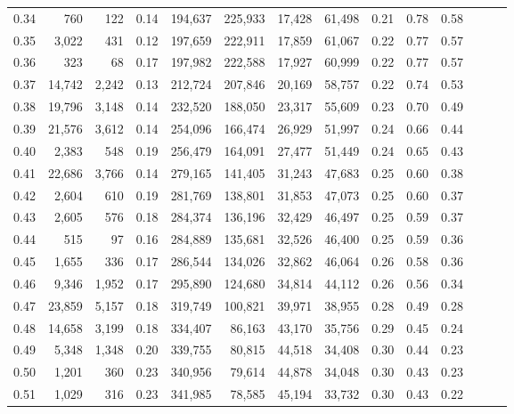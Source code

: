 \begin{tabular}{rrrrrrrrrrrrrr}
0.34 &     760 &    122 &  0.14 &  194,637 &  225,933 &  17,428 &  61,498 &  0.21 &  0.78 &      0.58 \\
0.35 &   3,022 &    431 &  0.12 &  197,659 &  222,911 &  17,859 &  61,067 &  0.22 &  0.77 &      0.57 \\
0.36 &     323 &     68 &  0.17 &  197,982 &  222,588 &  17,927 &  60,999 &  0.22 &  0.77 &      0.57 \\
0.37 &  14,742 &  2,242 &  0.13 &  212,724 &  207,846 &  20,169 &  58,757 &  0.22 &  0.74 &      0.53 \\
0.38 &  19,796 &  3,148 &  0.14 &  232,520 &  188,050 &  23,317 &  55,609 &  0.23 &  0.70 &      0.49 \\
0.39 &  21,576 &  3,612 &  0.14 &  254,096 &  166,474 &  26,929 &  51,997 &  0.24 &  0.66 &      0.44 \\
0.40 &   2,383 &    548 &  0.19 &  256,479 &  164,091 &  27,477 &  51,449 &  0.24 &  0.65 &      0.43 \\
0.41 &  22,686 &  3,766 &  0.14 &  279,165 &  141,405 &  31,243 &  47,683 &  0.25 &  0.60 &      0.38 \\
0.42 &   2,604 &    610 &  0.19 &  281,769 &  138,801 &  31,853 &  47,073 &  0.25 &  0.60 &      0.37 \\
0.43 &   2,605 &    576 &  0.18 &  284,374 &  136,196 &  32,429 &  46,497 &  0.25 &  0.59 &      0.37 \\
0.44 &     515 &     97 &  0.16 &  284,889 &  135,681 &  32,526 &  46,400 &  0.25 &  0.59 &      0.36 \\
0.45 &   1,655 &    336 &  0.17 &  286,544 &  134,026 &  32,862 &  46,064 &  0.26 &  0.58 &      0.36 \\
0.46 &   9,346 &  1,952 &  0.17 &  295,890 &  124,680 &  34,814 &  44,112 &  0.26 &  0.56 &      0.34 \\
0.47 &  23,859 &  5,157 &  0.18 &  319,749 &  100,821 &  39,971 &  38,955 &  0.28 &  0.49 &      0.28 \\
0.48 &  14,658 &  3,199 &  0.18 &  334,407 &   86,163 &  43,170 &  35,756 &  0.29 &  0.45 &      0.24 \\
0.49 &   5,348 &  1,348 &  0.20 &  339,755 &   80,815 &  44,518 &  34,408 &  0.30 &  0.44 &      0.23 \\
0.50 &   1,201 &    360 &  0.23 &  340,956 &   79,614 &  44,878 &  34,048 &  0.30 &  0.43 &      0.23 \\
0.51 &   1,029 &    316 &  0.23 &  341,985 &   78,585 &  45,194 &  33,732 &  0.30 &  0.43 &      0.22 \\

\end{tabular}
